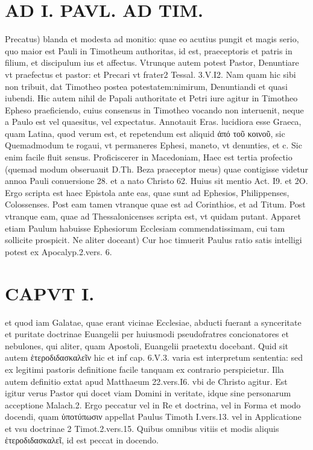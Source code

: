 \documentclass{article}
\begin{document}
\begin{pages}
\section*{AD I. PAVL. AD TIM. }
\marginpar{[ p.8 ]}\pstart Precatus) blanda et modesta ad monitio: quae eo acutius pungit et magis serio, quo maior est Pauli in Timotheum authoritas, id est, praeceptoris et patris in filium, et discipulum ius et affectus. Vtrunque autem potest Pastor, Denuntiare vt praefectus et pastor: et Precari vt frater2 Tessal. 3.V.I2. Nam quam hic sibi non tribuit, dat Timotheo postea potestatem:nimirum, Denuntiandi et quasi iubendi. Hic autem nihil de Papali authoritate et Petri iure agitur in Timotheo Epheso praeficiendo, cuius consensus in Timotheo vocando non interuenit, neque a Paulo est vel quaesitus, vel expectatus.  \pend\pstart Annotauit Eras. lucidiora esse Graeca, quam Latina, quod verum est, et repetendum est aliquid ἀπό τοῦ κοινοῦ, sic Quemadmodum te rogaui, vt permaneres Ephesi, maneto, vt denunties, et c. Sic enim facile fluit sensus.  \pend\pstart Proficiscerer in Macedoniam, Haec est tertia profectio (quemad modum obseruauit D.Th. Beza praeceptor meus) quae contigisse videtur annoa Pauli conuersione 28. et a nato Christo 62. Huius sit mentio Act. I9. et 2O. Ergo scripta est haec Epistola ante eas, quae sunt ad Ephesios, Philippenses, Colossenses. Post eam tamen vtranque quae est ad Corinthios, et ad Titum. Post vtranque eam, quae ad Thessalonicenses scripta est, vt quidam putant.  \pend\pstart Apparet etiam Paulum habuisse Ephesiorum Ecclesiam commendatissimam, cui tam sollicite prospicit.  \pend\pstart Ne aliter doceant) Cur hoc timuerit Paulus ratio satis intelligi potest ex Apocalyp.2.vers. 6.  \pend
\section*{CAPVT I. }
\marginpar{[ p.9 ]}\pstart et quod iam Galatae, quae erant vicinae Ecclesiae, abducti fuerant a synceritate et puritate doctrinae Euangelii per huiusmodi pseudofratres concionatores et nebulones, qui aliter, quam Apostoli, Euangelii praetextu docebant. Quid sit autem ἑτεροδιδασκαλεῖν hic et inf cap. 6.V.3. varia est interpretum sententia: sed ex legitimi pastoris definitione facile tanquam ex contrario perspicietur. Illa autem definitio extat apud Matthaeum 22.vers.I6. vbi de Christo agitur. Est igitur verus Pastor qui docet viam Domini in veritate, idque  sine personarum acceptione Malach.2. Ergo peccatur vel in Re et doctrina, vel in Forma et modo docendi, quam ὑποτύπωσιν appellat Paulus  Timoth I.vers.13. vel in Applicatione et vsu doctrinae 2 Timot.2.vers.15. Quibus omnibus vitiis et modis aliquis ἑτεροδιδασκαλεῖ, id est peccat in docendo.  \pend
{}
{}

\end{pages}
\end{document}
